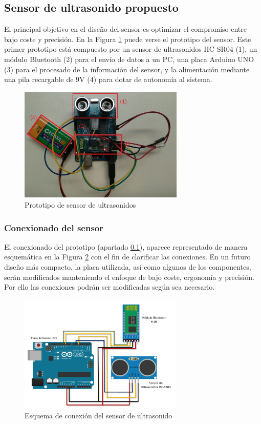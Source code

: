 \subsection{Sensor de ultrasonido propuesto}\label{su}

	El principal objetivo en el diseño del sensor es optimizar el compromiso entre bajo coste y precisión. En la Figura \ref{fig:sensor_ultrasonido} puede verse el prototipo del sensor. Este primer prototipo está compuesto por un sensor de ultrasonidos HC-SR04 (1), un módulo Bluetooth (2) para el envío de datos a un PC, una placa Arduino UNO (3) para el procesado de la información del sensor, y la alimentación mediante una pila recargable de 9V (4) para dotar de autonomía al sistema.

 \begin{figure}[H]
 	\centering
 	\includegraphics[width=0.7\textwidth]{./graphics/sensor}
 	\caption{Prototipo de sensor de ultrasonidos} \label{fig:sensor_ultrasonido}
 \end{figure}

	\subsubsection{Conexionado del sensor}
		El conexionado del prototipo (apartado \ref{su}), aparece representado de manera esquemática en la Figura \ref{fig:conexionado} con el fin de clarificar las conexiones. En un futuro diseño más compacto, la placa utilizada, así como algunos de los componentes, serán modificados manteniendo el enfoque de bajo coste, ergonomía y precisión. Por ello las conexiones podrán ser modificadas según sea necesario.
		
		 
		\begin{figure}[H]
			\centering
			\includegraphics[width=0.7\textwidth]{./graphics/conexionado}
			\caption{Esquema de conexión del sensor de ultrasonido} \label{fig:conexionado}
		\end{figure}
		
